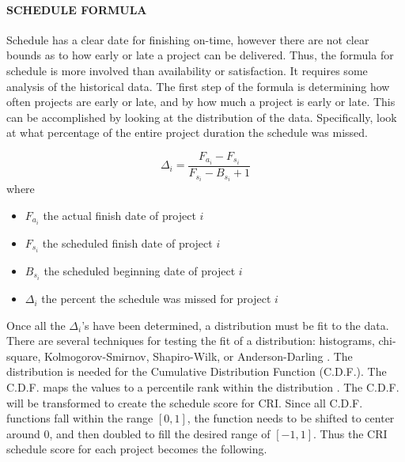 \documentclass[SDSUThesis.tex]{subfiles}
\begin{document}
            \paragraph{SCHEDULE FORMULA}
                Schedule has a clear date for finishing on-time, however
                there are not clear bounds as to how early or late a project
                can be delivered.  Thus, the formula for schedule is more involved
                than availability or satisfaction.  It requires some analysis
                of the historical data.  The first step of the formula is
                determining how often projects are early or late, and by how
                much a project is early or late.  This can be accomplished
                by looking at the distribution of the data.  Specifically,
                look at what percentage of the entire project duration the
                schedule was missed.  
                
                \begin{displaymath}
                    \Delta_i = \frac{F_{a_i} - F_{s_i}}{ F_{s_i} - B_{s_i} + 1}
                \end{displaymath}
                where
                \begin{itemize}
                    \item $F_{a_i}$ the actual finish date of project $i$
                    \item $F_{s_i}$ the scheduled finish date of project $i$
                    \item $B_{s_i}$ the scheduled beginning date of project $i$
                    \item $\Delta_i$ the percent the schedule was missed for project $i$
                \end{itemize}
                
                Once all the $\Delta_i$'s have been determined, a distribution must
                be fit to the data. There are several techniques for testing the fit
                of a distribution: histograms, chi-square, Kolmogorov-Smirnov, Shapiro-Wilk,
                or Anderson-Darling \cite{Damodaran2015,Kutner2003}.
                The distribution is needed for the Cumulative
                Distribution Function (C.D.F.). The C.D.F. maps the values
                to a percentile rank within the distribution \cite{Downey2011}.
                The C.D.F. will be transformed to create
                the schedule score for CRI. Since all C.D.F. functions fall within the
                range $[0,1]$, the function needs to be shifted to center around 0, and then
                doubled to fill the desired range of $[-1,1]$. Thus the CRI schedule score
                for each project becomes the following.
                
\end{document}
